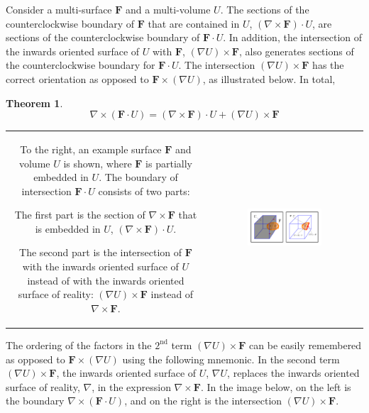 \documentclass{book}
\newtheorem{thm}{Theorem}
\begin{document}
Consider a multi-surface \(\mathbf{F}\) and a multi-volume \(U\). The sections of the counterclockwise boundary of \(\mathbf{F}\) that are contained in \(U\), \((\nabla \times \mathbf{F}) \cdot U\), are sections of the counterclockwise boundary of \(\mathbf{F} \cdot U\). In addition, the intersection of the inwards oriented surface of \(U\) with \(\mathbf{F}\), \((\nabla U) \times \mathbf{F}\), also generates sections of the counterclockwise boundary for \(\mathbf{F} \cdot U\). The intersection \((\nabla U) \times \mathbf{F}\) has the correct orientation as opposed to \(\mathbf{F} \times (\nabla U)\), as illustrated below. In total,  

\begin{thm}
\[\nabla \times (\mathbf{F} \cdot U) = (\nabla \times \mathbf{F}) \cdot U + (\nabla U) \times \mathbf{F}\]
\end{thm}

\begin{tabular}{cc}
\parbox{0.5\textwidth}{
To the right, an example surface \(\mathbf{F}\) and volume \(U\) is shown, where \(\mathbf{F}\) is partially embedded in \(U\). The boundary of intersection \(\mathbf{F} \cdot U\) consists of two parts: 

The first part is the section of \(\nabla \times \mathbf{F}\) that is embedded in \(U\), \((\nabla \times \mathbf{F}) \cdot U\). 

The second part is the intersection of \(\mathbf{F}\) with the inwards oriented surface of \(U\) instead of with the inwards oriented surface of reality: \((\nabla U) \times \mathbf{F}\) instead of \(\nabla \times \mathbf{F}\).  
} & \parbox{0.5\textwidth}{
\includegraphics[width = 0.5\textwidth]{Boundaries/Surface_boundaries/surface_volume_intersection_boundary}
}
\end{tabular}

The ordering of the factors in the \(2^\text{nd}\) term \((\nabla U) \times \mathbf{F}\) can be easily remembered as opposed to \(\mathbf{F} \times (\nabla U)\) using the following mnemonic. In the second term \((\nabla U) \times \mathbf{F}\), the inwards oriented surface of \(U\), \(\nabla U\), replaces the inwards oriented surface of reality, \(\nabla\), in the expression \(\nabla \times \mathbf{F}\). In the image below, on the left is the boundary \(\nabla \times (\mathbf{F} \cdot U)\), and on the right is the intersection \((\nabla U) \times \mathbf{F}\).
\end{document}
